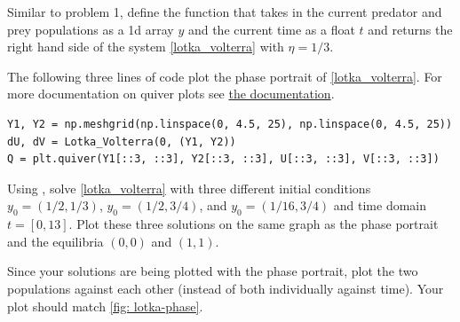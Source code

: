 

\begin{problem}
Similar to problem 1, define the function  that takes in the current predator and prey populations as a 1d array $y$ and the current time as a float $t$ and returns the right hand side of the system \eqref{lotka_volterra} with $\eta=1/3$.

The following three lines of code plot the phase portrait of \eqref{lotka_volterra}. 
For more documentation on quiver plots see \href{https://matplotlib.org/api/_as_gen/matplotlib.pyplot.quiver.html}{the documentation}.
\begin{lstlisting}
Y1, Y2 = np.meshgrid(np.linspace(0, 4.5, 25), np.linspace(0, 4.5, 25))
dU, dV = Lotka_Volterra(0, (Y1, Y2))
Q = plt.quiver(Y1[::3, ::3], Y2[::3, ::3], U[::3, ::3], V[::3, ::3])
\end{lstlisting}
Using , solve \eqref{lotka_volterra} with three different initial conditions $y_0 = (1/2, 1/3)$, $y_0=(1/2, 3/4)$, and $y_0=(1/16, 3/4)$ and time domain $t = [0,13]$. Plot these three solutions on the same graph as the phase portrait and the equilibria $(0,0)$ and $(1,1)$.

Since your solutions are being plotted with the phase portrait, plot the two populations against each other (instead of both individually against time). Your plot should match \ref{fig: lotka-phase}.
\end{problem}
